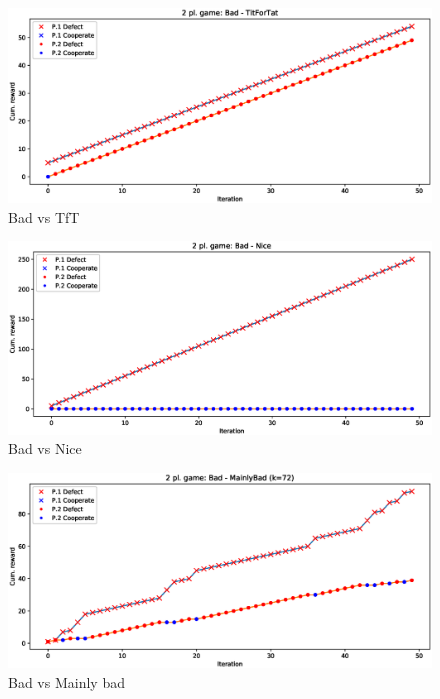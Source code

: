 \documentclass[journal,10pt,twoside]{IEEEtran}
\begin{document}
\begin{figure}[!ht]
    \centering
    \includegraphics[width=1\columnwidth]{../img/ipd2p/ipd2p-rewards-Bad-TitForTat}
    \caption{Bad vs TfT}
    \label{fig:badvstft}
\end{figure}

\begin{figure}[!ht]
    \centering
    \includegraphics[width=1\columnwidth]{../img/ipd2p/ipd2p-rewards-Bad-Nice}
    \caption{Bad vs Nice}
    \label{fig:badvsnice}
\end{figure}

\begin{figure}[!ht]
    \centering
    \includegraphics[width=1\columnwidth]{../img/ipd2p/ipd2p-rewards-Bad-MainlyBad(k=72)}
    \caption{Bad vs Mainly bad}
    \label{fig:badvsmainlybad}
\end{figure}
\end{document}
